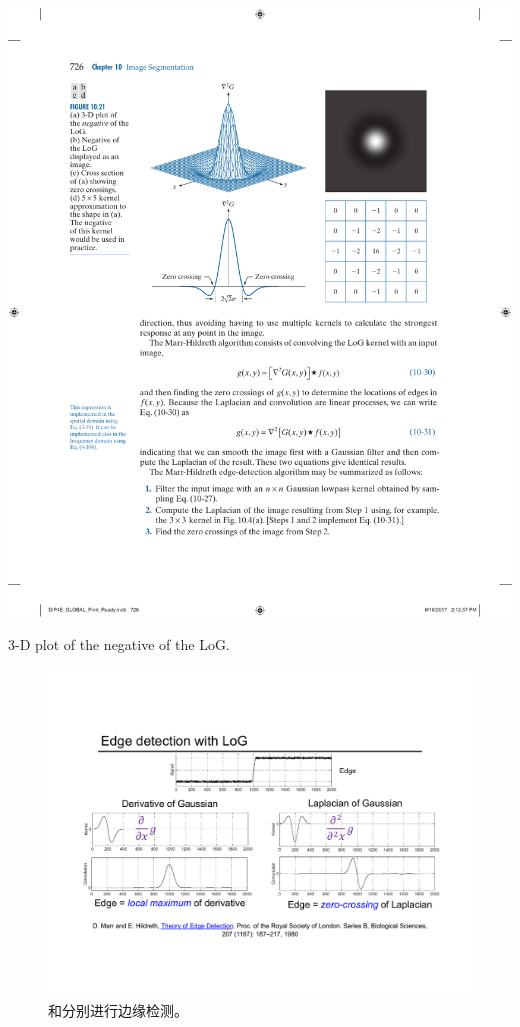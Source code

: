 \begin{marginfigure}
	\centering
	\includegraphics[width=\textwidth]{fig/LoG.pdf}
	\caption{3-D plot of the negative of the LoG.}
\end{marginfigure}

\begin{figure}[H]
	\centering
	\includegraphics[width=.9\textwidth]{fig/Edge detection with LoG.pdf}
	\caption{\gspd 和\lpl 分别进行边缘检测\cite{marr1980theory}。}
\end{figure}

